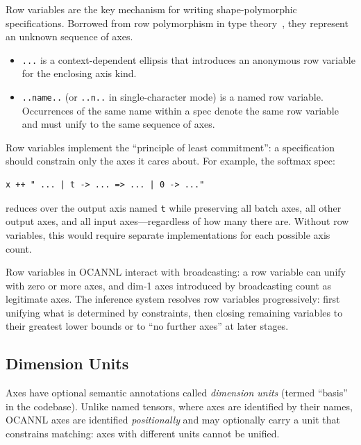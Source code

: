 \documentclass[acmsmall,nonacm,review]{acmart}
\newcommand{\spec}[1]{\texttt{\small #1}}
\begin{document}
Row variables are the key mechanism for writing shape-polymorphic
specifications. Borrowed from row polymorphism in type
theory~\cite{remy1993type}, they represent an unknown sequence of axes.

\begin{itemize}
\item \spec{...} is a context-dependent ellipsis that introduces an anonymous
  row variable for the enclosing axis kind.
\item \spec{..name..} (or \spec{..n..} in single-character mode) is a named
  row variable. Occurrences of the same name within a spec denote the same
  row variable and must unify to the same sequence of axes.
\end{itemize}

Row variables implement the ``principle of least commitment'': a
specification should constrain only the axes it cares about. For example,
the softmax spec:
\begin{lstlisting}
x ++ " ... | t -> ... => ... | 0 -> ..."
\end{lstlisting}
reduces over the output axis named \spec{t} while preserving all batch axes,
all other output axes, and all input axes---regardless of how many there are.
Without row variables, this would require separate implementations for each
possible axis count.

Row variables in OCANNL interact with broadcasting: a row variable can unify
with zero or more axes, and dim-1 axes introduced by broadcasting count as
legitimate axes. The inference system resolves row variables progressively:
first unifying what is determined by constraints, then closing remaining
variables to their greatest lower bounds or to ``no further axes'' at later
stages.

\subsection{Dimension Units}
\label{sec:units}

Axes have optional semantic annotations called \emph{dimension units}
(termed ``basis'' in the codebase). Unlike named tensors, where axes are
identified by their names, OCANNL axes are identified \emph{positionally}
and may optionally carry a unit that constrains matching: axes with different
units cannot be unified.
\end{document}

